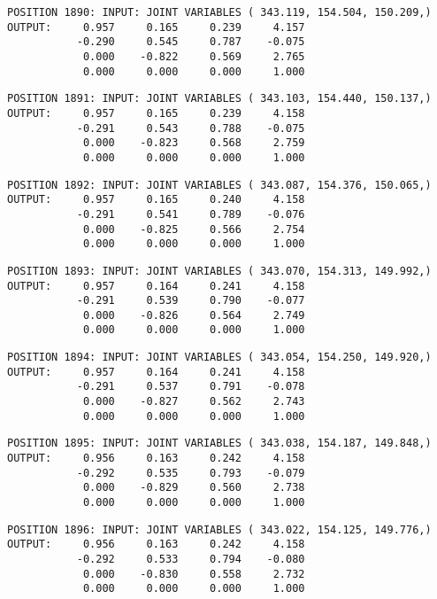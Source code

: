 \begin{verbatim}
POSITION 1890: INPUT: JOINT VARIABLES ( 343.119, 154.504, 150.209,)
OUTPUT:     0.957     0.165     0.239     4.157
           -0.290     0.545     0.787    -0.075
            0.000    -0.822     0.569     2.765
            0.000     0.000     0.000     1.000
\end{verbatim} \pagebreak[1]\begin{verbatim}
POSITION 1891: INPUT: JOINT VARIABLES ( 343.103, 154.440, 150.137,)
OUTPUT:     0.957     0.165     0.239     4.158
           -0.291     0.543     0.788    -0.075
            0.000    -0.823     0.568     2.759
            0.000     0.000     0.000     1.000
\end{verbatim} \pagebreak[1]\begin{verbatim}
POSITION 1892: INPUT: JOINT VARIABLES ( 343.087, 154.376, 150.065,)
OUTPUT:     0.957     0.165     0.240     4.158
           -0.291     0.541     0.789    -0.076
            0.000    -0.825     0.566     2.754
            0.000     0.000     0.000     1.000
\end{verbatim} \pagebreak[1]\begin{verbatim}
POSITION 1893: INPUT: JOINT VARIABLES ( 343.070, 154.313, 149.992,)
OUTPUT:     0.957     0.164     0.241     4.158
           -0.291     0.539     0.790    -0.077
            0.000    -0.826     0.564     2.749
            0.000     0.000     0.000     1.000
\end{verbatim} \pagebreak[1]\begin{verbatim}
POSITION 1894: INPUT: JOINT VARIABLES ( 343.054, 154.250, 149.920,)
OUTPUT:     0.957     0.164     0.241     4.158
           -0.291     0.537     0.791    -0.078
            0.000    -0.827     0.562     2.743
            0.000     0.000     0.000     1.000
\end{verbatim} \pagebreak[1]\begin{verbatim}
POSITION 1895: INPUT: JOINT VARIABLES ( 343.038, 154.187, 149.848,)
OUTPUT:     0.956     0.163     0.242     4.158
           -0.292     0.535     0.793    -0.079
            0.000    -0.829     0.560     2.738
            0.000     0.000     0.000     1.000
\end{verbatim} \pagebreak[1]\begin{verbatim}
POSITION 1896: INPUT: JOINT VARIABLES ( 343.022, 154.125, 149.776,)
OUTPUT:     0.956     0.163     0.242     4.158
           -0.292     0.533     0.794    -0.080
            0.000    -0.830     0.558     2.732
            0.000     0.000     0.000     1.000
\end{verbatim} \pagebreak[1]\begin{verbatim}

\end{verbatim}
